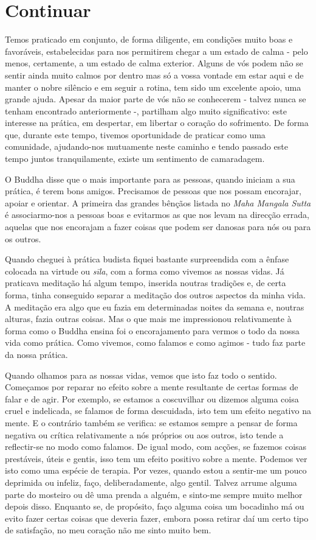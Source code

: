 \chapter{Continuar}

Temos praticado em conjunto, de forma diligente, em condições muito boas
e favoráveis, estabelecidas para nos permitirem chegar a um estado de
calma - pelo menos, certamente, a um estado de calma exterior. Alguns de
vós podem não se sentir ainda muito calmos por dentro mas só a vossa
vontade em estar aqui e de manter o nobre silêncio e em seguir a rotina,
tem sido um excelente apoio, uma grande ajuda. Apesar da maior parte de
vós não se conhecerem - talvez nunca se tenham encontrado anteriormente
-, partilham algo muito significativo: este interesse na prática, em
despertar, em libertar o coração do sofrimento. De forma que, durante
este tempo, tivemos oportunidade de praticar como uma comunidade,
ajudando-nos mutuamente neste caminho e tendo passado este tempo juntos
tranquilamente, existe um sentimento de camaradagem.

O Buddha disse que o mais importante para as pessoas, quando iniciam a
sua prática, é terem bons amigos. Precisamos de pessoas que nos possam
encorajar, apoiar e orientar. A primeira das grandes bênçãos listada no
\emph{Maha Mangala Sutta} é associarmo-nos a pessoas boas e evitarmos as
que nos levam na direcção errada, aquelas que nos encorajam a fazer
coisas que podem ser danosas para nós ou para os outros.

Quando cheguei à prática budista fiquei bastante surpreendida com a
ênfase colocada na virtude ou \emph{sīla}, com a forma como vivemos as
nossas vidas. Já praticava meditação há algum tempo, inserida noutras
tradições e, de certa forma, tinha conseguido separar a meditação dos
outros aspectos da minha vida. A meditação era algo que eu fazia em
determinadas noites da semana e, noutras alturas, fazia outras coisas.
Mas o que mais me impressionou relativamente à forma como o Buddha
ensina foi o encorajamento para vermos o todo da nossa vida como
prática. Como vivemos, como falamos e como agimos - tudo faz parte da
nossa prática.

Quando olhamos para as nossas vidas, vemos que isto faz todo o sentido.
Começamos por reparar no efeito sobre a mente resultante de certas
formas de falar e de agir. Por exemplo, se estamos a coscuvilhar ou
dizemos alguma coisa cruel e indelicada, se falamos de forma descuidada,
isto tem um efeito negativo na mente. E o contrário também se verifica:
se estamos sempre a pensar de forma negativa ou crítica relativamente a
nós próprios ou aos outros, isto tende a reflectir-se no modo como
falamos. De igual modo, com acções, se fazemos coisas prestáveis, úteis
e gentis, isso tem um efeito positivo sobre a mente. Podemos ver isto
como uma espécie de terapia. Por vezes, quando estou a sentir-me um
pouco deprimida ou infeliz, faço, deliberadamente, algo gentil. Talvez
arrume alguma parte do mosteiro ou dê uma prenda a alguém, e sinto-me
sempre muito melhor depois disso. Enquanto se, de propósito, faço alguma
coisa um bocadinho má ou evito fazer certas coisas que deveria fazer,
embora possa retirar daí um certo tipo de satisfação, no meu coração não
me sinto muito bem.

